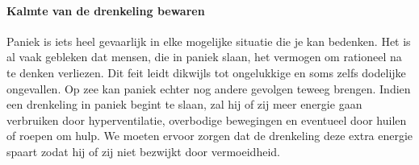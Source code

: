 \paragraph{Kalmte van de drenkeling bewaren}

Paniek is iets heel gevaarlijk in elke mogelijke situatie die je kan bedenken. Het is al vaak gebleken dat mensen, die in paniek slaan, het vermogen om rationeel na te denken verliezen. Dit feit leidt dikwijls tot ongelukkige en soms zelfs dodelijke ongevallen. Op zee kan paniek echter nog andere gevolgen teweeg brengen. Indien een drenkeling in paniek begint te slaan, zal hij of zij meer energie gaan verbruiken door hyperventilatie, overbodige bewegingen en eventueel door huilen of roepen om hulp. We moeten ervoor zorgen dat de drenkeling deze extra energie spaart zodat hij of zij niet bezwijkt door vermoeidheid.